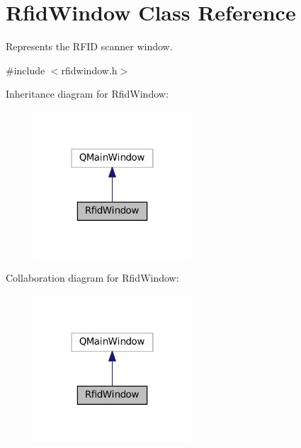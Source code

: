 \hypertarget{classRfidWindow}{}\section{Rfid\+Window Class Reference}
\label{classRfidWindow}


Represents the R\+F\+ID scanner window.  




{\ttfamily \#include $<$rfidwindow.\+h$>$}



Inheritance diagram for Rfid\+Window\+:\nopagebreak
\begin{figure}[H]
\begin{center}
\leavevmode
\includegraphics[width=166pt]{classRfidWindow__inherit__graph}
\end{center}
\end{figure}


Collaboration diagram for Rfid\+Window\+:\nopagebreak
\begin{figure}[H]
\begin{center}
\leavevmode
\includegraphics[width=166pt]{classRfidWindow__coll__graph}
\end{center}
\end{figure}

